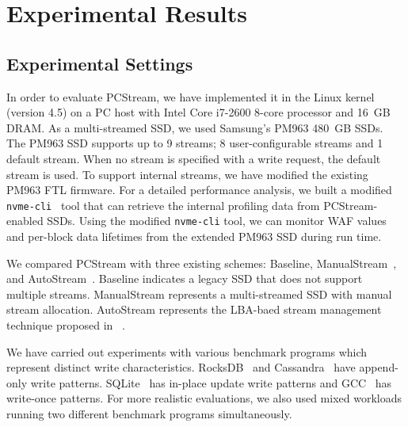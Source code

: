 \vspace{-10pt}
\section{Experimental Results}
\vspace{-5pt}
\subsection{Experimental Settings}
\vspace{-5pt}
In order to evaluate \textsf{\small PCStream}, we have implemented it in the
Linux kernel (version 4.5) on a PC host with Intel Core i7-2600 8-core
processor and 16~GB DRAM.  As a multi-streamed SSD, we used Samsung's PM963
480~GB SSDs.  The PM963 SSD supports up to 9 streams; 8 user-configurable
streams and 1 default stream.  When no stream is specified with a write
request, the default stream is used.  To support internal streams, we have
modified the existing PM963 FTL firmware.  For a detailed performance analysis,
we built a modified {\tt nvme-cli}~\cite{nvmecli} tool that can retrieve the internal
profiling data from \textsf{\small PCStream}-enabled SSDs.  
Using the modified {\tt nvme-cli} tool, we can monitor 
WAF values and per-block data lifetimes from the extended PM963 SSD during run time.

We compared \textsf{\small PCStream} with three existing schemes:
\textsf{\small Baseline}, \textsf{\small ManualStream}~\cite{MultiStream}, and
\textsf{\small AutoStream}~\cite{AutoStream}.  \textsf{\small Baseline}
indicates a legacy SSD that does not support multiple streams. \textsf{\small
ManualStream} represents a multi-streamed SSD with manual stream allocation.
\textsf{\small AutoStream} represents the LBA-baed stream management technique
proposed in ~\cite{AutoStream}. 


We have carried out experiments with various benchmark programs
which represent distinct write characteristics.
RocksDB~\cite{RocksDB} and Cassandra~\cite{Cassandra} have
append-only write patterns. SQLite~\cite{SQLite} has in-place update write patterns
and GCC~\cite{GCC} has write-once patterns.  
For more realistic evaluations, we also used mixed workloads running two 
different benchmark programs simultaneously.


